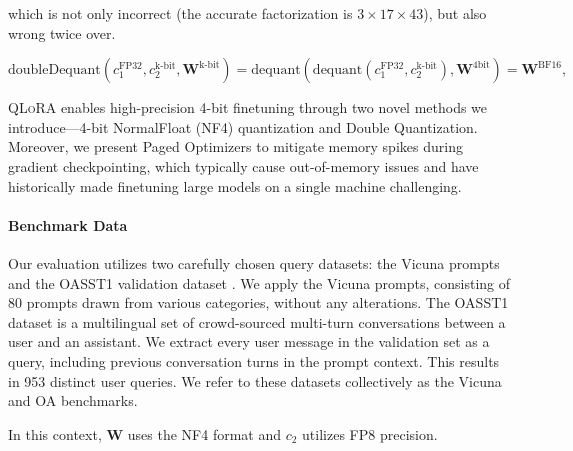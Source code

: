 which is not only incorrect (the accurate factorization is $3 \times 17 \times 43$), but also wrong twice over.

\begin{equation}
    \text{doubleDequant}(c_1^{\text{FP32}}, c_2^{\text{k-bit}}, \mathbf{W}^{\text{k-bit}}) = \text{dequant}(\text{dequant}(c_1^{\text{FP32}}, c_2^{\text{k-bit}}), \mathbf{W}^{\text{4bit}}) = \mathbf{W}^{\text{BF16}},
\end{equation}

\textsc{QLoRA} enables high-precision 4-bit finetuning through two novel methods we introduce—4-bit NormalFloat (NF4) quantization and Double Quantization. Moreover, we present Paged Optimizers to mitigate memory spikes during gradient checkpointing, which typically cause out-of-memory issues and have historically made finetuning large models on a single machine challenging.

\paragraph{Benchmark Data} Our evaluation utilizes two carefully chosen query datasets: the Vicuna prompts \citep{vicuna2023} and the OASST1 validation dataset \citep{kopf2023openassistant}. We apply the Vicuna prompts, consisting of 80 prompts drawn from various categories, without any alterations. The OASST1 dataset is a multilingual set of crowd-sourced multi-turn conversations between a user and an assistant. We extract every user message in the validation set as a query, including previous conversation turns in the prompt context. This results in 953 distinct user queries. We refer to these datasets collectively as the Vicuna and OA benchmarks.

In this context, $\mathbf{W}$ uses the NF4 format and $c_2$ utilizes FP8 precision.

